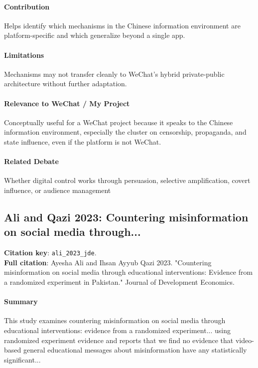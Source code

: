 \documentclass[12pt]{article}
\begin{document}
\paragraph{Contribution} Helps identify which mechanisms in the Chinese information environment are platform-specific and which generalize beyond a single app.

\paragraph{Limitations} Mechanisms may not transfer cleanly to WeChat's hybrid private-public architecture without further adaptation.

\paragraph{Relevance to WeChat / My Project} Conceptually useful for a WeChat project because it speaks to the Chinese information environment, especially the cluster on censorship, propaganda, and state influence, even if the platform is not WeChat.

\paragraph{Related Debate} Whether digital control works through persuasion, selective amplification, covert influence, or audience management


\subsection{Ali and Qazi 2023: Countering misinformation on social media through...}
\textbf{Citation key}: \texttt{ali\_2023\_jde}.\\
\textbf{Full citation}: Ayesha Ali and Ihsan Ayyub Qazi 2023. "Countering misinformation on social media through educational interventions: Evidence from a randomized experiment in Pakistan." Journal of Development Economics.

\paragraph{Summary} This study examines countering misinformation on social media through educational interventions: evidence from a randomized experiment... using randomized experiment evidence and reports that we find no evidence that video-based general educational messages about misinformation have any statistically significant...
\end{document}
